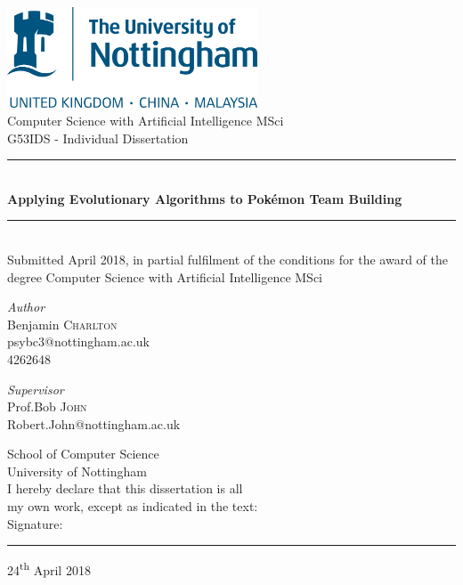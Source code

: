 \documentclass[a4paper]{article}
\newcommand{\Pokemon}{Pok\'{e}mon}
\begin{document}
\begin{titlepage}
	\newcommand{\HRule}{\rule{\linewidth}{0.5mm}}
	\center{}

	\includegraphics[height=3cm]{UoNLogo.png}\\[0.5cm]
	\Large{Computer Science with Artificial Intelligence MSci}\\[0.5cm]
	\large{G53IDS - Individual Dissertation}\\[0.5cm]

	\HRule{}\\[0.4cm]
	{\huge\bfseries Applying Evolutionary Algorithms to \Pokemon{} Team Building}\\[0.4cm]
	\HRule{}\\[1.5cm]

	Submitted April 2018, in partial fulfilment of the conditions for the award of the degree Computer Science with Artificial Intelligence MSci
	\vfill

	\begin{minipage}{0.4\textwidth}
		\begin{flushleft}
			\large
			\textit{Author}\\
			Benjamin \textsc{Charlton}\\
            psybc3@nottingham.ac.uk\\
            4262648
		\end{flushleft}
	\end{minipage}
    \begin{minipage}{0.4\textwidth}
		\begin{flushright}
			\large
			\textit{Supervisor}\\
			Prof.\@ Bob \textsc{John}\\
            Robert.John@nottingham.ac.uk
		\end{flushright}
	\end{minipage}


	\vfill
	School of Computer Science \\
	University of Nottingham \\

	\vfill
	I hereby declare that this dissertation is all \\
	my own work, except as indicated in the text:
	\\ [1cm]
	Signature:\rule{6cm}{0.15mm}

	\vfill\vfill\vfill
	{\large24\textsuperscript{th} April 2018}
	\vfill

\afterpage{\null\newpage}
\normalsize{}
\end{titlepage}
\end{document}
